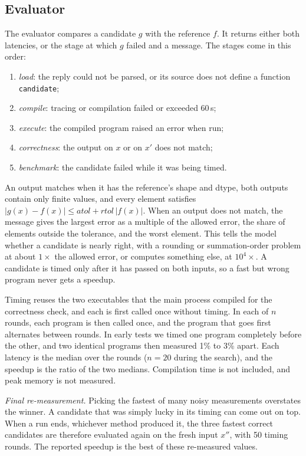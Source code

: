 \documentclass[conference]{IEEEtran}
\begin{document}
\subsection{Evaluator}
The evaluator compares a candidate $g$ with the reference $f$. It returns
either both latencies, or the stage at which $g$ failed and a message. The
stages come in this order:
\begin{enumerate}
  \item \emph{load}: the reply could not be parsed, or its source does not
    define a function \texttt{candidate};
  \item \emph{compile}: tracing or compilation failed or exceeded 60\,s;
  \item \emph{execute}: the compiled program raised an error when run;
  \item \emph{correctness}: the output on $x$ or on $x'$ does not match;
  \item \emph{benchmark}: the candidate failed while it was being timed.
\end{enumerate}
An output matches when it has the reference's shape and dtype, both outputs
contain only finite values, and every element satisfies
$|g(x)-f(x)| \le \mathit{atol} + \mathit{rtol}\,|f(x)|$. When an output does
not match, the message gives the largest error as a multiple of the allowed
error, the share of elements outside the tolerance, and the worst element.
This tells the model whether a candidate is nearly right, with a rounding or
summation-order problem at about $1\times$ the allowed error, or computes
something else, at $10^4\times$. A candidate is timed only after it has
passed on both inputs, so a fast but wrong program never gets a speedup.

Timing reuses the two executables that the main process compiled for the
correctness check, and each is first called once without timing. In each of
$n$ rounds, each program is then called once, and the program that goes
first alternates between rounds. In early tests we timed one program
completely before the other, and two identical programs then measured 1\%
to 3\% apart. Each latency is the median over the rounds ($n = 20$ during
the search), and the speedup is the ratio of the two medians. Compilation
time is not included, and peak memory is not measured.

\emph{Final re-measurement.} Picking the fastest of many noisy measurements overstates the winner. A
candidate that was simply lucky in its timing can come out on top. When a
run ends, whichever method produced it, the three fastest correct candidates
are therefore evaluated again on the fresh input $x''$, with 50 timing
rounds. The reported speedup is the best of these re-measured values.
\end{document}
